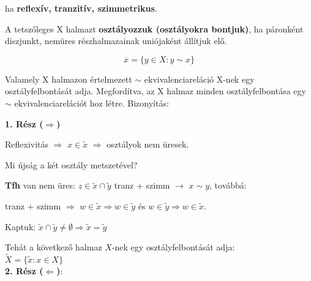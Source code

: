 \begin{frame}
\begin{tcolorbox}[title={Def.: Ekvivalenciareláció}]
ha \textbf{reflexív, tranzitív, szimmetrikus}.
\end{tcolorbox}

\begin{tcolorbox}[title={Def.: Halmaz osztályfelbontása}]
A tetszőleges X halmazt \textbf{osztályozzuk (osztályokra bontjuk)}, ha páronként diszjunkt, nemüres részhalmazainak uniójaként állítjuk elő.
\end{tcolorbox}

\begin{tcolorbox}[title={Az X $\in$ X elem \textbf{ekvivalencia osztálya}:}]
$$\overline{x} = \{y \in X : y \sim x\}$$
\end{tcolorbox}

\begin{tcolorbox}[title={Tétel: Ekvivalenciareláció és osztályfelbontás kapcsolata}]
Valamely X halmazon értelmezett $\sim$ ekvivalenciareláció X-nek egy osztályfelbontását adja. Megfordítva, az X halmaz minden osztályfelbontása egy $\sim$ ekvivalenciarelációt hoz létre.
\tcblower
Bizonyítás:\\
\mmedskip

\textbf{1. Rész ($\Rightarrow$)}\\
\mmedskip

Reflexivitás $\Rightarrow$ $x \in \tilde{x}$ $\Rightarrow$ osztályok nem üresek.\\
\msmallskip

Mi újság a két osztály metszetével?\\
\msmallskip

\textbf{Tfh} van nem üres: $z \in \tilde{x} \cap \tilde{y}$ tranz + szimm $\rightarrow$ $x \sim y$, továbbá:\\
\msmallskip

tranz + szimm $\Rightarrow$ $w \in \tilde{x} \Rightarrow w \in \tilde{y}$ és $w \in \tilde{y} \Rightarrow w \in \tilde{x}$.
\msmallskip

Kaptuk: $\tilde{x} \cap \tilde{y} \neq \emptyset \Rightarrow \tilde{x} = \tilde{y}$
\mmedskip

Tehát a következő halmaz $X$-nek egy osztályfelbontását adja:\\
$\tilde{X} = \{ \tilde{x} : x \in X \}$\\

\textbf{2. Rész ($\Leftarrow$)}:\\
\mmedskip


\end{tcolorbox}
\end{frame}
